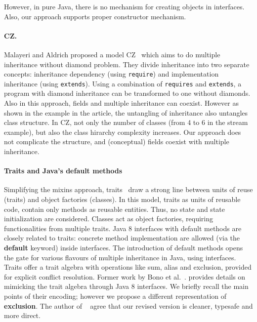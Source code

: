 However, in pure Java, there is no mechanism for creating objects in
interfaces. Also, our approach supports proper constructor mechanism.

\paragraph{CZ.}
Malayeri and Aldrich proposed a model CZ~\cite{malayeri2009cz} which aims to do
multiple inheritance without diamond problem. They divide inheritance into two
separate concepts: inheritance dependency (using \texttt{require}) and
implementation inheritance (using \texttt{extends}). Using a combination of
\texttt{requires} and \texttt{extends}, a program with diamond inheritance can be
transformed to one without diamonds. Also in this approach, fields and multiple
inheritance can coexist. However as shown in the example in the article, the
untangling of inheritance also untangles class structure. In CZ, not only the
number of classes (from 4 to 6 in the stream example), but also the class
hirarchy complexity increases. Our approach does not complicate the structure,
and (conceptual) fields coexist with multiple inheritance.

\paragraph{Traits and Java's default methods}
Simplifying the mixins approach, traits~\cite{scharli03traits} draw a
strong line between units of reuse (traits) and object factories
(classes). In this model, traits as units of reusable code, contain
only methods as reusable entities. Thus, no state and state
initialization are considered. Classes act as object factories,
requiring functionalities from multiple traits. Java 8 interfaces with
default methods are closely related to traits: concrete method
implementation are allowed (via the \textbf{default} keyword) inside
interfaces. The introduction of default methods opens the gate for
various flavours of multiple inheritance in Java, using interfaces.
Traits offer a trait algebra with operations like sum, alias and exclusion, provided
for explicit conflict resolution.  
Former work by Bono et al.~\cite{bono14}. provides details on
mimicking the trait algebra through Java 8 interfaces. 
We briefly recall the main points of their encoding;
however we propose a different representation of \textbf{exclusion}.
The author of ~\cite{bono14} agree that our revised version is
cleaner, typesafe and more direct.


